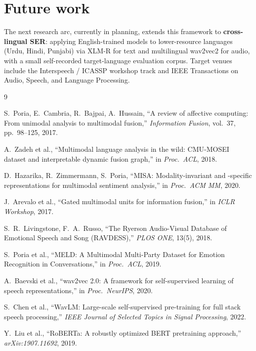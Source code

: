 \documentclass[a4paper,10pt]{article}
\begin{document}
\section*{Future work}

The next research arc, currently in planning, extends this framework to
\textbf{cross-lingual SER}: applying English-trained models to lower-resource
languages (Urdu, Hindi, Punjabi) via XLM-R for text and multilingual
wav2vec2 for audio, with a small self-recorded target-language evaluation
corpus. Target venues include the Interspeech / ICASSP workshop track and
IEEE Transactions on Audio, Speech, and Language Processing.

\begin{thebibliography}{9}

 S.\ Poria, E.\ Cambria, R.\ Bajpai, A.\ Hussain,
``A review of affective computing: From unimodal analysis to multimodal
fusion,'' \emph{Information Fusion}, vol.\ 37, pp.\ 98--125, 2017.

 A.\ Zadeh et al., ``Multimodal language analysis in
the wild: CMU-MOSEI dataset and interpretable dynamic fusion graph,'' in
\emph{Proc.\ ACL}, 2018.

 D.\ Hazarika, R.\ Zimmermann, S.\ Poria, ``MISA:
Modality-invariant and -specific representations for multimodal sentiment
analysis,'' in \emph{Proc.\ ACM MM}, 2020.

 J.\ Arevalo et al., ``Gated multimodal units for
information fusion,'' in \emph{ICLR Workshop}, 2017.

 S.\ R.\ Livingstone, F.\ A.\ Russo, ``The Ryerson
Audio-Visual Database of Emotional Speech and Song (RAVDESS),''
\emph{PLOS ONE}, 13(5), 2018.

 S.\ Poria et al., ``MELD: A Multimodal Multi-Party
Dataset for Emotion Recognition in Conversations,'' in \emph{Proc.\ ACL},
2019.

 A.\ Baevski et al., ``wav2vec 2.0: A framework for
self-supervised learning of speech representations,'' in \emph{Proc.\
NeurIPS}, 2020.

 S.\ Chen et al., ``WavLM: Large-scale self-supervised
pre-training for full stack speech processing,'' \emph{IEEE Journal of
Selected Topics in Signal Processing}, 2022.

 Y.\ Liu et al., ``RoBERTa: A robustly optimized BERT
pretraining approach,'' \emph{arXiv:1907.11692}, 2019.

\end{thebibliography}
\end{document}
